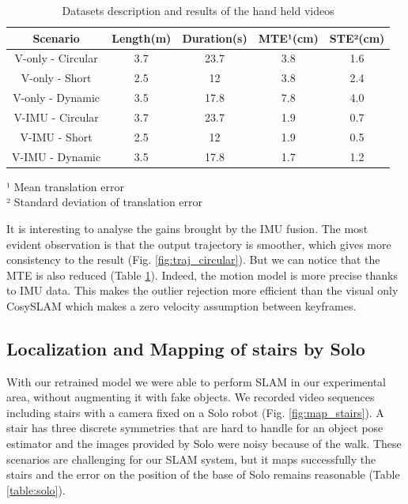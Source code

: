 \begin{table}%
    \begin{center}
    \caption{Datasets description and results of the hand held videos}
    \label{table:tless}
    \begin{tabular}{|c|c|c|c|c|}
        \hline 
        Scenario  & Length(m) & Duration(s) & MTE¹(cm) & STE²(cm) \\
        \hline 
         V-only - Circular & 3.7 & 23.7 & 3.8 & 1.6\\
        \hline 
         V-only - Short & 2.5 & 12 & 3.8 & 2.4 \\
        \hline 
         V-only - Dynamic & 3.5 & 17.8 & 7.8 & 4.0  \\
        \hline 
         V-IMU - Circular & 3.7 & 23.7 & 1.9 & 0.7\\
        \hline 
         V-IMU - Short & 2.5 & 12 & 1.9 & 0.5 \\
        \hline 
         V-IMU - Dynamic & 3.5 & 17.8 & 1.7 & 1.2  \\
        \hline
    \end{tabular}
    \end{center}
¹ Mean translation error \\
² Standard deviation of translation error
\end{table}

It is interesting to analyse the gains brought by the IMU fusion. The most evident observation is that the output trajectory is smoother, which gives more consistency 
to the result (Fig. \ref{fig:traj_circular}). But we can notice that the MTE is also reduced (Table \ref{table:tless}). Indeed, the motion model is more precise thanks 
to IMU data. This makes the outlier rejection more efficient than the visual only CosySLAM which makes a zero velocity assumption between keyframes.


\subsection{Localization and Mapping of stairs by Solo}

With our retrained model we were able to perform SLAM in our experimental area, without augmenting it with fake objects. 
We recorded video sequences including stairs with a camera fixed on a Solo robot (Fig. \ref{fig:map_stairs}). A stair has three discrete symmetries 
that are hard to handle for an object pose estimator and the images provided by Solo were noisy because of the walk. 
These scenarios are challenging for our SLAM system, but it maps successfully the stairs and the error on the position of the base of Solo remains reasonable 
(Table \ref{table:solo}).

